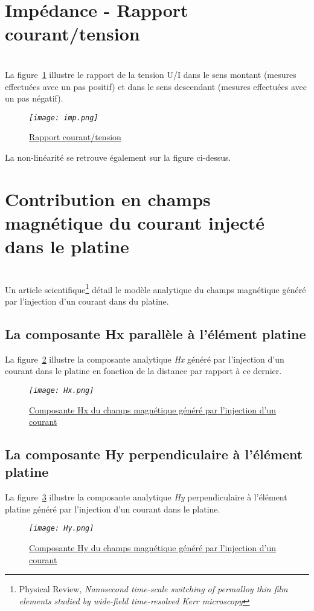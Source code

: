 \documentclass[12pt,fleqn]{book} %
\begin{document}
\section{Impédance - Rapport courant/tension}
~\\\noindent La figure~\underline{\color{blue}\ref{imp}} illustre le rapport de la tension U/I dans le sens montant (mesures effectuées avec un pas positif) et dans le sens descendant (mesures effectuées avec un pas négatif).
\begin{figure}[H]
	\centering
	\itshape
	\texttt{[image: imp.png]}
	\caption{\label{imp} \underline{Rapport courant/tension}}
\end{figure}
La non-linéarité se retrouve également sur la figure ci-dessus.
\section{Contribution en champs magnétique du courant injecté dans le platine}
~\\\noindent Un article scientifique\footnote{Physical Review, \emph{Nanosecond time-scale switching of permalloy thin film elements studied by wide-field time-resolved Kerr microscopy}} détail le modèle analytique du champs magnétique généré par l'injection d'un courant dans du platine.
\subsection{La composante Hx parallèle à l'élément platine}
\noindent La figure~\underline{\color{blue}\ref{hx}} illustre la composante analytique \emph{Hx} généré par l'injection d'un courant dans le platine en fonction de la distance par rapport à ce dernier.
\begin{figure}[H]
	\centering
	\itshape
	\texttt{[image: Hx.png]}
	\caption{\label{hx} \underline{Composante Hx du champs magnétique généré par l'injection d'un courant}}
\end{figure}
\subsection{La composante Hy perpendiculaire à l'élément platine}
\noindent La figure~\underline{\color{blue}\ref{hy}} illustre la composante analytique \emph{Hy} perpendiculaire à l'élément platine généré par l'injection d'un courant dans le platine.
\begin{figure}[H]
	\centering
	\itshape
	\texttt{[image: Hy.png]}
	\caption{\label{hy} \underline{Composante Hy du champs magnétique généré par l'injection d'un courant}}
\end{figure}
\end{document}
